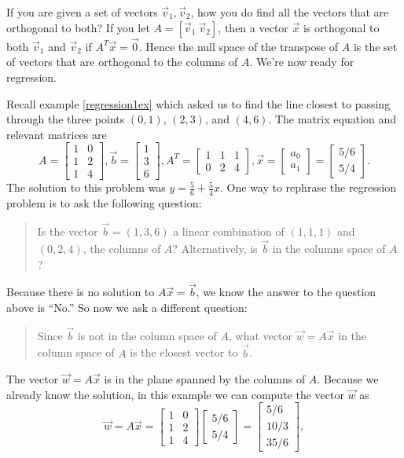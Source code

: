 If you are given a set of vectors $\vec v_1,\vec v_2$, how you do find all the vectors that are orthogonal to both?  
If you let $A = [\vec v_1\ \vec v_2]$, then a vector $\vec x$ is orthogonal to both $\vec v_1$ and $\vec v_2$ if $A^T\vec x=\vec 0$.
Hence the null space of the transpose of $A$ is the set of vectors that are orthogonal to the columns of $A$.  
We're now ready for regression.


\begin{example}
Recall example \ref{regression1ex} which asked us to find the line closest to passing through the three points $(0,1)$, $(2,3)$, and $(4,6)$.
The matrix equation and relevant matrices are
$$
A = \begin{bmatrix}1&0\\1&2\\1&4\end{bmatrix},
\vec b = \begin{bmatrix}1\\3\\6\end{bmatrix}, 
A^T= \begin{bmatrix}1&1&1\\0&2&4\end{bmatrix}, 
\vec x = \begin{bmatrix}a_0\\a_1\end{bmatrix}  
= \begin{bmatrix}5/6\\5/4\end{bmatrix} .
$$
The solution to this problem was $y=\frac56 +\frac54 x$.  
One way to rephrase the regression problem is to ask the following question: 
\begin{quote}
Is the vector $\vec b=(1,3,6)$ a linear combination of $(1,1,1)$ and $(0,2,4)$, the columns of $A$? Alternatively, is $\vec b$ in the columns space of $A$?
\end{quote}
Because there is no solution to $A\vec x = \vec b$, we know the answer to the question above is ``No.''  So now we ask a different question:
\begin{quote}
Since $\vec b$ is not in the column space of $A$, what vector $\vec w=A\vec x$ in the column space of $A$ is the closest vector to $\vec b$. 
\end{quote}
The vector $\vec w=A\vec x$ is in the plane spanned by the columns of $A$. Because we already know the solution, in this example we can compute the vector $\vec w$ as
$$
\vec w = A \vec x = \begin{bmatrix}1&0\\1&2\\1&4\end{bmatrix}\begin{bmatrix}5/6\\5/4\end{bmatrix} = \begin{bmatrix}5/6\\10/3\\35/6  \end{bmatrix},
$$
\end{example}
